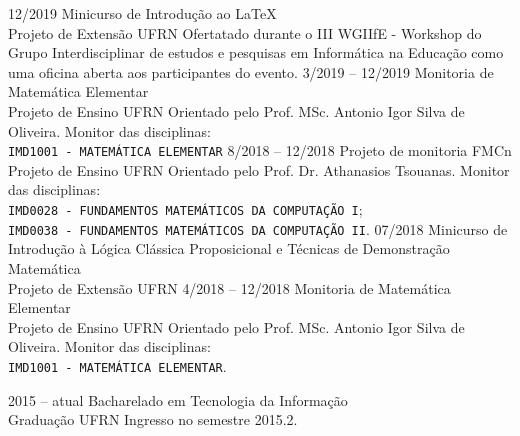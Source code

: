 \documentclass[9pt]{developercv} %
\begin{document}


\begin{entrylist}
    \entry
        {12/2019}
        {Minicurso de Introdução ao \LaTeX{}
        \\\footnotesize{{Projeto de Extensão}}}
        {UFRN}
        {Ofertatado durante o III WGIIfE - Workshop do Grupo Interdisciplinar de estudos e pesquisas em Informática na Educação como uma oficina aberta aos participantes do evento.}
    \entry
        {3/2019 -- 12/2019}
        {Monitoria de Matemática Elementar\\
        \footnotesize{Projeto de Ensino}}
        {UFRN}
        {Orientado pelo Prof. MSc. Antonio Igor Silva de Oliveira. Monitor das disciplinas:\\
        \texttt{IMD1001 - MATEMÁTICA ELEMENTAR}}
    \entry
        {8/2018 -- 12/2018}
        {Projeto de monitoria FMCn\\
        \footnotesize{Projeto de Ensino}}
        {UFRN}
        {Orientado pelo Prof. Dr. Athanasios Tsouanas. Monitor das disciplinas:
        \\\texttt{IMD0028 - FUNDAMENTOS MATEMÁTICOS DA COMPUTAÇÃO I};
        \\\texttt{IMD0038 - FUNDAMENTOS MATEMÁTICOS DA COMPUTAÇÃO II}.}
    \entry
        {07/2018}
        {Minicurso de Introdução à Lógica Clássica Proposicional e Técnicas de Demonstração Matemática\\
        \footnotesize{{Projeto de Extensão}}}
        {UFRN}
        {}
    \entry
        {4/2018 -- 12/2018}
        {Monitoria de Matemática Elementar\\
        \footnotesize{Projeto de Ensino}}
        {UFRN}
        {Orientado pelo Prof. MSc. Antonio Igor Silva de Oliveira. Monitor das disciplinas:\\
        \texttt{IMD1001 - MATEMÁTICA ELEMENTAR}.}
\end{entrylist}



\begin{entrylist}
    \entry
        {2015 -- atual}
        {Bacharelado em Tecnologia da Informação\\\footnotesize{Graduação}}
        {UFRN}
        {Ingresso no semestre 2015.2.}
\end{entrylist}
\end{document}
